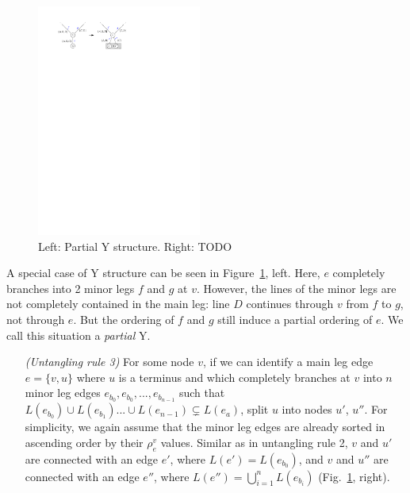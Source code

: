 \documentclass[sigconf]{acmart}
\begin{document}
\begin{figure}
  \centering
  \includegraphics[width=0.48\textwidth]{untangling/y_partial.pdf}
  \caption{Left: Partial Y structure. Right: TODO}  
  \label{FIG:untangle_y_partial}
\end{figure}


A special case of Y structure can be seen in Figure~\ref{FIG:untangle_y_partial}, left. Here, $e$ completely branches into 2 minor legs $f$ and $g$ at $v$. However, the lines of the minor legs are not completely contained in the main leg: line $D$ continues through $v$ from $f$ to $g$, not through $e$. But the ordering of $f$ and $g$ still induce a partial ordering of $e$. We call this situation a \emph{partial} Y.

\begin{enumerate}[parsep=0.5mm, wide, labelwidth=0mm, itemindent=2.3mm]
  \setlength\itemsep{1pt}
  \item[\emph{(Untangling rule 3)}] For some node $v$, if we can identify a main leg edge $e = \{v, u\}$ where $u$ is a terminus and which completely branches at $v$ into $n$ minor leg edges $e_{b_0}, e_{b_0}, ..., e_{b_{n-1}}$ such that $L(e_{b_0}) \cup L(e_{b_1}) ... \cup L(e_{n-1}) \subsetneq L(e_a)$, split $u$ into nodes $u'$, $u''$. For simplicity, we again assume that the minor leg edges are already sorted in ascending order by their $\rho^v_e$ values. Similar as in untangling rule 2, $v$ and $u'$ are connected with an edge $e'$, where $L(e') = L(e_{b_0})$, and $v$ and $u''$ are connected with an edge $e''$, where $L(e'') = \bigcup^{n}_{i = 1} L(e_{b_i})$  (Fig.~\ref{FIG:untangle_y_partial}, right).
\end{enumerate}
\end{document}
